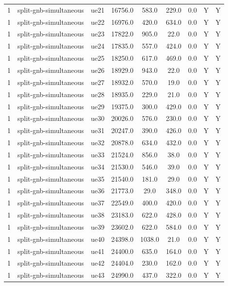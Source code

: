 \begin{table}[ht]
\begin{tabular}{|c|c|c|c|c|c|c|c|c|}
1 & split-gnb-simultaneous & ue21 & 16756.0 & 583.0 & 229.0 & 0.0 & Y & Y \\
1 & split-gnb-simultaneous & ue22 & 16976.0 & 420.0 & 634.0 & 0.0 & Y & Y \\
1 & split-gnb-simultaneous & ue23 & 17822.0 & 905.0 & 22.0 & 0.0 & Y & Y \\
1 & split-gnb-simultaneous & ue24 & 17835.0 & 557.0 & 424.0 & 0.0 & Y & Y \\
1 & split-gnb-simultaneous & ue25 & 18250.0 & 617.0 & 469.0 & 0.0 & Y & Y \\
1 & split-gnb-simultaneous & ue26 & 18929.0 & 943.0 & 22.0 & 0.0 & Y & Y \\
1 & split-gnb-simultaneous & ue27 & 18932.0 & 570.0 & 19.0 & 0.0 & Y & Y \\
1 & split-gnb-simultaneous & ue28 & 18935.0 & 229.0 & 21.0 & 0.0 & Y & Y \\
1 & split-gnb-simultaneous & ue29 & 19375.0 & 300.0 & 429.0 & 0.0 & Y & Y \\
1 & split-gnb-simultaneous & ue30 & 20026.0 & 576.0 & 230.0 & 0.0 & Y & Y \\
1 & split-gnb-simultaneous & ue31 & 20247.0 & 390.0 & 426.0 & 0.0 & Y & Y \\
1 & split-gnb-simultaneous & ue32 & 20878.0 & 634.0 & 432.0 & 0.0 & Y & Y \\
1 & split-gnb-simultaneous & ue33 & 21524.0 & 856.0 & 38.0 & 0.0 & Y & Y \\
1 & split-gnb-simultaneous & ue34 & 21530.0 & 546.0 & 39.0 & 0.0 & Y & Y \\
1 & split-gnb-simultaneous & ue35 & 21540.0 & 181.0 & 29.0 & 0.0 & Y & Y \\
1 & split-gnb-simultaneous & ue36 & 21773.0 & 29.0 & 348.0 & 0.0 & Y & Y \\
1 & split-gnb-simultaneous & ue37 & 22549.0 & 400.0 & 420.0 & 0.0 & Y & Y \\
1 & split-gnb-simultaneous & ue38 & 23183.0 & 622.0 & 428.0 & 0.0 & Y & Y \\
1 & split-gnb-simultaneous & ue39 & 23602.0 & 622.0 & 584.0 & 0.0 & Y & Y \\
1 & split-gnb-simultaneous & ue40 & 24398.0 & 1038.0 & 21.0 & 0.0 & Y & Y \\
1 & split-gnb-simultaneous & ue41 & 24400.0 & 635.0 & 164.0 & 0.0 & Y & Y \\
1 & split-gnb-simultaneous & ue42 & 24404.0 & 230.0 & 162.0 & 0.0 & Y & Y \\
1 & split-gnb-simultaneous & ue43 & 24990.0 & 437.0 & 322.0 & 0.0 & Y & Y \\

\end{tabular}
\end{table}
